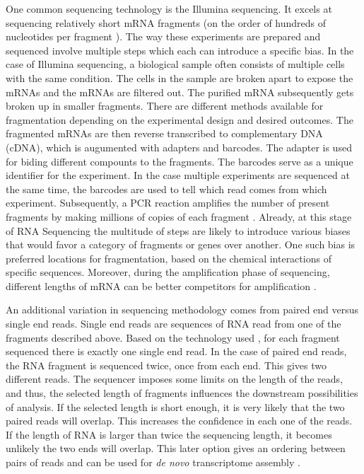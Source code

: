 \documentclass[12pt]{article}
\begin{document}
    One common sequencing technology is the Illumina sequencing. It excels at sequencing relatively short mRNA fragments (on the order of hundreds of nucleotides per fragment \cite{Illumina, illuminaSeq}).  The way these experiments are prepared and sequenced involve multiple steps which each can introduce a specific bias. In the case of Illumina sequencing, a biological sample often consists of multiple cells with the same condition. The cells in the sample are broken apart to expose the mRNAs and the mRNAs are filtered out. The purified mRNA subsequently gets broken up in smaller fragments. There are different methods available for fragmentation depending on the experimental design and desired outcomes. The fragmented mRNAs are then reverse transcribed to complementary DNA (cDNA), which is augumented with adapters and barcodes. The adapter is used for biding different compounts to the fragments. The barcodes serve as a unique identifier for the experiment. In the case multiple experiments are sequenced at the same time, the barcodes are used to tell which read comes from which experiment. Subsequently, a PCR reaction amplifies the number of present fragments by making millions of copies of each fragment \cite{Goswami2016}. Already, at this stage of RNA Sequencing the multitude of steps are likely to introduce various biases that would favor a category of fragments or genes over another. One such bias is preferred locations for fragmentation, based on the chemical interactions of specific sequences. Moreover, during the amplification phase of sequencing, different lengths of mRNA can be better competitors for amplification \cite{Lahens2014}. 
    
    An additional variation in sequencing methodology comes from paired end versus single end reads. Single end reads are sequences of RNA read from one of the fragments described above. Based on the technology used \cite{Freedman2020}, for each fragment sequenced there is exactly one single end read. In the case of paired end reads, the RNA fragment is sequenced twice, once from each end. This gives two different reads. The sequencer imposes some limits on the length of the reads, and thus, the selected length of fragments influences the downstream possibilities of analysis. If the selected length is short enough, it is very likely that the two paired reads will overlap. This increases the confidence in each one of the reads. If the length of RNA is larger than twice the sequencing length, it becomes unlikely the two ends will overlap. This later option gives an ordering between pairs of reads and can be used for \textit{de novo} transcriptome assembly \cite{Hlzer2019}.
    
\end{document}
